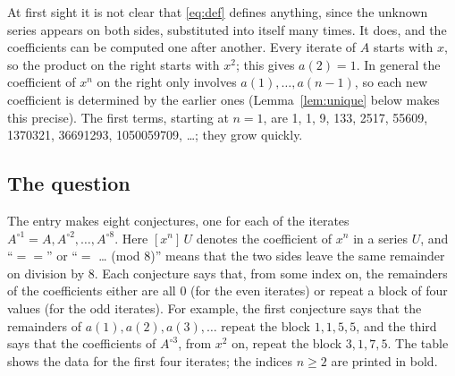 \documentclass[11pt,a4paper]{article}
\theoremstyle{definition}
\theoremstyle{remark}
\begin{document}
At first sight it is not clear that \eqref{eq:def} defines anything, since the unknown series appears on both sides,
substituted into itself many times. It does, and the coefficients can be computed one after another. Every iterate
of $A$ starts with $x$, so the product on the right starts with $x^2$; this gives $a(2)=1$. In general the
coefficient of $x^n$ on the right only involves $a(1),\dots,a(n-1)$, so each new coefficient is determined by the
earlier ones (Lemma~\ref{lem:unique} below makes this precise). The first terms, starting at $n=1$, are
1, 1, 9, 133, 2517, 55609, 1370321, 36691293, 1050059709, \dots; they grow quickly.

\subsection{The question}
The entry makes eight conjectures, one for each of the iterates $A^{\circ1}=A,A^{\circ2},\dots,A^{\circ8}$.
Here $[x^n]\,U$ denotes the coefficient of $x^n$ in a series $U$, and ``$==$'' or ``$=$ \dots{} (mod 8)'' means that
the two sides leave the same remainder on division by $8$. Each conjecture says that, from some index on, the
remainders of the coefficients either are all $0$ (for the even iterates) or repeat a block of four values (for the
odd iterates). For example, the first conjecture says that the remainders of $a(1),a(2),a(3),\dots$ repeat the block
$1,1,5,5$, and the third says that the coefficients of $A^{\circ3}$, from $x^2$ on, repeat the block $3,1,7,5$. The
table shows the data for the first four iterates; the indices $n\ge2$ are printed in bold.
\end{document}
